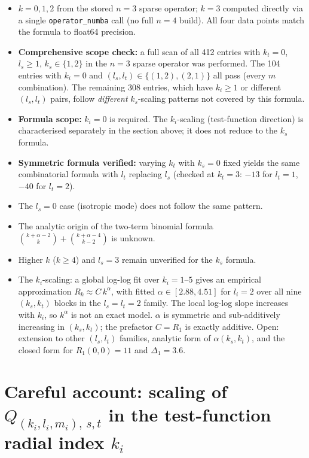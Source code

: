 \documentclass{article}
\begin{document}
\begin{itemize}
  \item $k=0,1,2$ from the stored $n=3$ sparse operator; $k=3$ computed
        directly via a single \texttt{operator\_numba} call (no full $n=4$ build).
        All four data points match the formula to float64 precision.
  \item \textbf{Comprehensive scope check:} a full scan of all 412 entries with
        $k_t=0$, $l_s\geq 1$, $k_s\in\{1,2\}$ in the $n=3$ sparse operator was
        performed.  The 104 entries with $k_i=0$ and
        $(l_s,l_t)\in\{(1,2),(2,1)\}$ all pass (every $m$ combination).
        The remaining 308 entries, which have $k_i\geq 1$ or different
        $(l_s,l_t)$ pairs, follow \emph{different} $k_s$-scaling patterns not
        covered by this formula.
  \item \textbf{Formula scope:} $k_i=0$ is required.  The $k_i$-scaling
        (test-function direction) is characterised separately in the section
        above; it does not reduce to the $k_s$ formula.
  \item \textbf{Symmetric formula verified:} varying $k_t$ with $k_s=0$ fixed
        yields the same combinatorial formula with $l_t$ replacing $l_s$
        (checked at $k_t=3$: $-13$ for $l_t=1$, $-40$ for $l_t=2$).
  \item The $l_s = 0$ case (isotropic mode) does not follow the same pattern.
  \item The analytic origin of the two-term binomial formula
        $\binom{k+\alpha-2}{k} + \binom{k+\alpha-4}{k-2}$ is unknown.
  \item Higher $k$ ($k\geq 4$) and $l_s=3$ remain unverified for the $k_s$
        formula.
  \item The $k_i$-scaling: a global log-log fit over $k_i=1$--$5$ gives an
        empirical approximation $R_k \approx C\,k^\alpha$, with fitted
        $\alpha\in[2.88,4.51]$ for $l_i=2$ over all nine $(k_s,k_t)$ blocks
        in the $l_s=l_t=2$ family.  The local log-log slope increases with
        $k_i$, so $k^\alpha$ is not an exact model.  $\alpha$ is symmetric and
        sub-additively increasing in $(k_s,k_t)$; the prefactor $C=R_1$ is
        exactly additive.  Open: extension to other $(l_s,l_t)$ families,
        analytic form of $\alpha(k_s,k_t)$, and the closed form for
        $R_1(0,0)=11$ and $\Delta_1=3.6$.
\end{itemize}

\newpage
\section*{Careful account: scaling of $Q_{(k_i,l_i,m_i),\,s,t}$ in the test-function
          radial index $k_i$}
\end{document}
